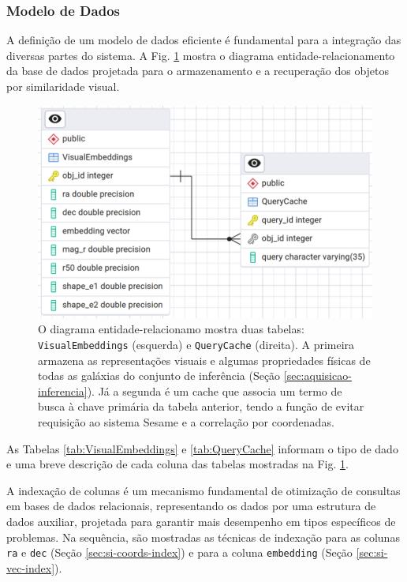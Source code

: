 \subsubsection{Modelo de Dados}
\label{sec:si-datamodel}

A definição de um modelo de dados eficiente é fundamental para a integração das diversas partes do sistema. A Fig. \ref{fig:db} mostra o diagrama entidade-relacionamento da base de dados projetada para o armazenamento e a recuperação dos objetos por similaridade visual.

\begin{figure}[!ht]
  \centering
  \includegraphics[width=\linewidth]{figures/database.png}
  \caption{O diagrama entidade-relacionamo mostra duas tabelas: \texttt{VisualEmbeddings} (esquerda) e \texttt{QueryCache} (direita). A primeira armazena as representações visuais e algumas propriedades físicas de todas as galáxias do conjunto de inferência (Seção \ref{sec:aquisicao-inferencia}). Já a segunda é um cache que associa um termo de busca à chave primária da tabela anterior, tendo a função de evitar requisição ao sistema Sesame e a correlação por coordenadas.}
  \label{fig:db}
\end{figure}


As Tabelas \ref{tab:VisualEmbeddings} e \ref{tab:QueryCache} informam o tipo de dado e uma breve descrição de cada coluna das tabelas mostradas na Fig. \ref{fig:db}.

A indexação de colunas é um mecanismo fundamental de otimização de consultas em bases de dados relacionais, representando os dados por uma estrutura de dados auxiliar, projetada para garantir mais desempenho em tipos específicos de problemas. Na sequência, são mostradas as técnicas de indexação para as colunas \texttt{ra} e \texttt{dec} (Seção \ref{sec:si-coords-index}) e para a coluna \texttt{embedding} (Seção \ref{sec:si-vec-index}).

